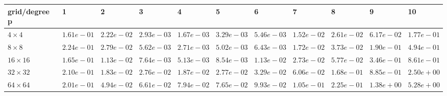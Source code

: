 \begin{tabular}{lllllllllll}
\hline
 grid/degree p   & 1          & 2          & 3          & 4          & 5          & 6          & 7          & 8          & 9          & 10         \\
\hline
 $4 \times 4$    & $1.61e-01$ & $2.22e-02$ & $2.93e-03$ & $1.67e-03$ & $3.29e-03$ & $5.46e-03$ & $1.52e-02$ & $2.61e-02$ & $6.17e-02$ & $1.77e-01$ \\
 $8 \times 8$    & $2.24e-01$ & $2.79e-02$ & $5.62e-03$ & $2.71e-03$ & $5.02e-03$ & $6.43e-03$ & $1.72e-02$ & $3.73e-02$ & $1.90e-01$ & $4.94e-01$ \\
 $16 \times 16$  & $1.65e-01$ & $1.13e-02$ & $7.64e-03$ & $5.13e-03$ & $8.54e-03$ & $1.13e-02$ & $2.73e-02$ & $5.77e-02$ & $3.46e-01$ & $8.61e-01$ \\
 $32 \times 32$  & $2.10e-01$ & $1.83e-02$ & $2.76e-02$ & $1.87e-02$ & $2.77e-02$ & $3.29e-02$ & $6.06e-02$ & $1.68e-01$ & $8.85e-01$ & $2.50e+00$ \\
 $64 \times 64$  & $2.01e-01$ & $4.94e-02$ & $6.61e-02$ & $7.94e-02$ & $7.65e-02$ & $9.93e-02$ & $1.05e-01$ & $2.25e-01$ & $1.38e+00$ & $5.28e+00$ \\
\hline
\end{tabular}